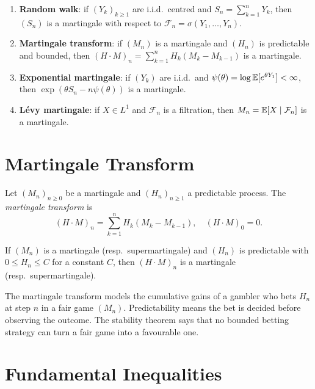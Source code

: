 \begin{example}
\begin{enumerate}
  \item \textbf{Random walk}: if $(Y_k)_{k \geq 1}$ are i.i.d.\ centred and
    $S_n = \sum_{k=1}^n Y_k$, then $(S_n)$ is a martingale with respect to
    $\mathcal{F}_n = \sigma(Y_1, \ldots, Y_n)$.
  \item \textbf{Martingale transform}: if $(M_n)$ is a martingale and $(H_n)$
    is predictable and bounded, then
    $(H \cdot M)_n = \sum_{k=1}^n H_k (M_k - M_{k-1})$ is a martingale.
  \item \textbf{Exponential martingale}: if $(Y_k)$ are i.i.d.\ and
    $\psi(\theta) = \log \mathbb{E}[e^{\theta Y_1}] < \infty$, then
    $\exp(\theta S_n - n\psi(\theta))$ is a martingale.
  \item \textbf{L\'evy martingale}: if $X \in L^1$ and $\mathcal{F}_n$ is a
    filtration, then $M_n = \mathbb{E}[X \mid \mathcal{F}_n]$ is a martingale.
\end{enumerate}
\end{example}

\section{Martingale Transform}

\begin{definition}
Let $(M_n)_{n \geq 0}$ be a martingale and $(H_n)_{n \geq 1}$ a predictable
process. The \emph{martingale transform} is
\[
  (H \cdot M)_n = \sum_{k=1}^{n} H_k (M_k - M_{k-1}), \quad (H \cdot M)_0 = 0.
\]
\end{definition}

\begin{theorem}[Stability]
If $(M_n)$ is a martingale (resp.\ supermartingale) and $(H_n)$ is predictable
with $0 \leq H_n \leq C$ for a constant $C$, then $(H \cdot M)_n$ is a
martingale (resp.\ supermartingale).
\end{theorem}

\begin{intuition}[title=\textbf{Gambling Strategy}]
The martingale transform models the cumulative gains of a gambler who bets $H_n$
at step $n$ in a fair game $(M_n)$. Predictability means the bet is decided
before observing the outcome. The stability theorem says that no bounded betting
strategy can turn a fair game into a favourable one.
\end{intuition}

\section{Fundamental Inequalities}

